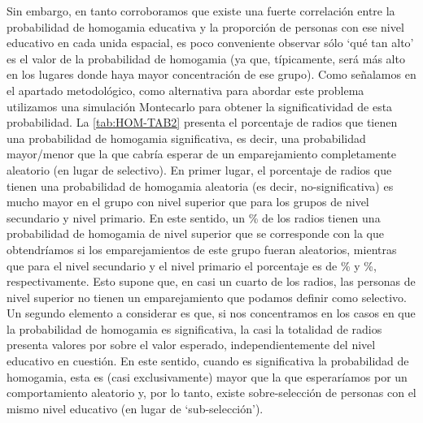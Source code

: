\documentclass[
  spanish,
  a4paper,%
  chapterprefix=true,%
  DIV=calc,%
  twoside]{scrbook}%
\begin{document}
Sin embargo, en tanto corroboramos que existe una fuerte correlación
entre la probabilidad de homogamia educativa y la proporción de personas
con ese nivel educativo en cada unida espacial, es poco conveniente
observar sólo `qué tan alto' es el valor de la probabilidad de homogamia
(ya que, típicamente, será más alto en los lugares donde haya mayor
concentración de ese grupo). Como señalamos en el apartado metodológico,
como alternativa para abordar este problema utilizamos una simulación
Montecarlo para obtener la significatividad de esta probabilidad. La
\ref{tab:HOM-TAB2} presenta el porcentaje de radios que tienen una
probabilidad de homogamia significativa, es decir, una probabilidad
mayor/menor que la que cabría esperar de un emparejamiento completamente
aleatorio (en lugar de selectivo). En primer lugar, el porcentaje de
radios que tienen una probabilidad de homogamia aleatoria (es decir,
no-significativa) es mucho mayor en el grupo con nivel superior que para
los grupos de nivel secundario y nivel primario. En este sentido, un
\% de los radios tienen una
probabilidad de homogamia de nivel superior que se corresponde con la
que obtendríamos si los emparejamientos de este grupo fueran aleatorios,
mientras que para el nivel secundario y el nivel primario el porcentaje
es de \% y
\%, respectivamente. Esto
supone que, en casi un cuarto de los radios, las personas de nivel
superior no tienen un emparejamiento que podamos definir como selectivo.
Un segundo elemento a considerar es que, si nos concentramos en los
casos en que la probabilidad de homogamia es significativa, la casi la
totalidad de radios presenta valores por sobre el valor esperado,
independientemente del nivel educativo en cuestión. En este sentido,
cuando es significativa la probabilidad de homogamia, esta es (casi
exclusivamente) mayor que la que esperaríamos por un comportamiento
aleatorio y, por lo tanto, existe sobre-selección de personas con el
mismo nivel educativo (en lugar de `sub-selección').
\end{document}
